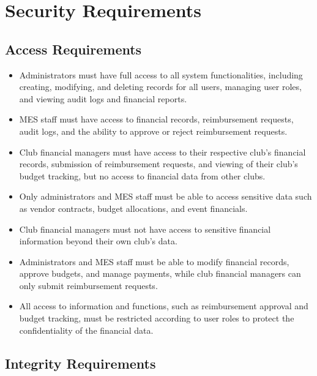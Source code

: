\documentclass[12pt]{article}
\begin{document}
\section{Security Requirements}
\subsection{Access Requirements}

\begin{itemize}
  \item Administrators must have full access to all system functionalities, including creating, modifying, and deleting records for all users, managing user roles, and viewing audit logs and financial reports.
  \item MES staff must have access to financial records, reimbursement requests, audit logs, and the ability to approve or reject reimbursement requests.
  \item Club financial managers must have access to their respective club's financial records, submission of reimbursement requests, and viewing of their club's budget tracking, but no access to financial data from other clubs.
  \item Only administrators and MES staff must be able to access sensitive data such as vendor contracts, budget allocations, and event financials.
  \item Club financial managers must not have access to sensitive financial information beyond their own club's data.
  \item Administrators and MES staff must be able to modify financial records, approve budgets, and manage payments, while club financial managers can only submit reimbursement requests.
  \item All access to information and functions, such as reimbursement approval and budget tracking, must be restricted according to user roles to protect the confidentiality of the financial data.
\end{itemize}

\subsection{Integrity Requirements}
\end{document}
